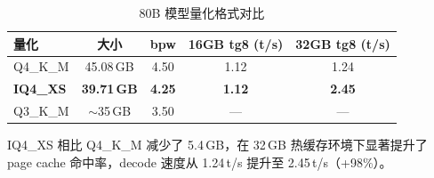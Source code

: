 \begin{table}[H]
    \centering
    \caption{80B 模型量化格式对比}
    \label{tab:quant_comparison}
    \begin{tabular}{lcccc}
        \toprule
        \textbf{量化} & \textbf{大小} & \textbf{bpw} & \textbf{16GB tg8 (t/s)} & \textbf{32GB tg8 (t/s)} \\
        \midrule
        Q4\_K\_M & 45.08\,GB & 4.50 & 1.12 & 1.24 \\
        \textbf{IQ4\_XS} & \textbf{39.71\,GB} & \textbf{4.25} & \textbf{1.12} & \textbf{2.45} \\
        Q3\_K\_M & $\sim$35\,GB & 3.50 & --- & --- \\
        \bottomrule
    \end{tabular}
\end{table}

IQ4\_XS 相比 Q4\_K\_M 减少了 5.4\,GB，在 32\,GB 热缓存环境下显著提升了 page cache 命中率，decode 速度从 1.24\,t/s 提升至 2.45\,t/s（+98\%）。
